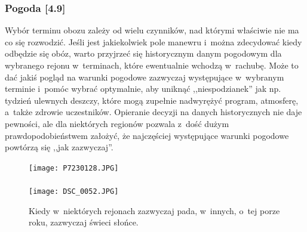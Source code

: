 \documentclass[a5paper,10pt,titlepage,twoside]{article}
\begin{document}
\subsubsection{Pogoda [4.9]\label{pogoda}}
Wybór terminu obozu zależy od wielu czynników, nad którymi właściwie nie ma co się rozwodzić. Jeśli jest jakiekolwiek pole manewru i~można zdecydować kiedy odbędzie się obóz, warto przyjrzeć się historycznym danym pogodowym dla wybranego rejonu w~terminach, które ewentualnie wchodzą w~rachubę. Może to dać jakiś pogląd na warunki pogodowe zazwyczaj występujące w~wybranym terminie i~pomóc wybrać optymalnie, aby uniknąć ,,niespodzianek'' jak np. tydzień ulewnych deszczy, które mogą zupełnie nadwyrężyć program, atmosferę, a~także zdrowie uczestników. Opieranie decyzji na danych historycznych nie daje pewności, ale dla niektórych regionów pozwala z~dość dużym prawdopodobieństwem założyć, że najczęściej występujące warunki pogodowe powtórzą się ,,jak zazwyczaj''.
\begin{figure}[htp]
\centering
\texttt{[image: P7230128.JPG]}\\
~~~~~~~~\\
\texttt{[image: DSC\_0052.JPG]}
\caption{Kiedy w~niektórych rejonach zazwyczaj pada, w~innych, o~tej porze roku, zazwyczaj świeci słońce.}\label{fig:deszcz-i-slonce}
\end{figure}
\\
\\
\end{document}

